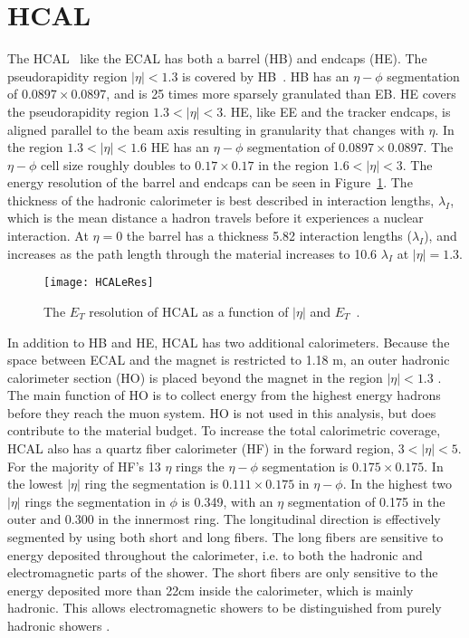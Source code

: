   \section{HCAL}
    The HCAL~\cite{Baiatian:2007xva} like the ECAL has both a barrel (HB) and endcaps (HE).
    The pseudorapidity region $|\eta|<1.3$ is covered by HB~\cite{tCmsE}. 
    HB has an $\eta-\phi$ segmentation of $0.0897\times0.0897$, and is 25 times more
    	sparsely granulated than EB.
    HE covers the pseudorapidity region $1.3<|\eta|<3$.
    HE, like EE and the tracker endcaps, is aligned parallel to the beam axis
    	resulting in granularity that changes with $\eta$.
    In the region $1.3 <|\eta|< 1.6$ HE has an $\eta-\phi$ segmentation of 
    	$0.0897\times0.0897$.
    The $\eta-\phi$ cell size roughly doubles to $0.17\times0.17$ in the region
    	$1.6 <|\eta|< 3$.
    The energy resolution of the barrel and endcaps can be seen in  
    	Figure~\ref{HCALeRes}.
    The thickness of the hadronic calorimeter is best described in interaction
    	lengths, $\lambda_I$, which is the mean distance a hadron travels before 
       it experiences a nuclear interaction.
    At $\eta = 0$ the barrel has a thickness 5.82 interaction lengths 
    	($\lambda_{I}$), and increases as the path length through the material 
    	increases to 10.6 $\lambda_{I}$ at $|\eta| = 1.3$.
    \begin{figure}[h]
      \centering
        \texttt{[image: HCALeRes]}
      \caption{The $E_{T}$ resolution of HCAL as a function of $|\eta|$ and 
        $E_{T}$~\cite{tCmsE}.}
      \label{HCALeRes}
    \end{figure}
    
    In addition to HB and HE, HCAL has two additional calorimeters.
    Because the space between ECAL and the magnet is restricted to 1.18 m, an
    	outer hadronic calorimeter section (HO) is placed beyond the magnet
    	in the region $|\eta|<1.3$ \cite{tCmsE}.
    The main function of HO is to collect energy from the highest energy hadrons
    	before they reach the muon system.
    HO is not used in this analysis, but does contribute to the material budget. 
    To increase the total calorimetric coverage, HCAL also has a quartz fiber 
    	calorimeter (HF) in the forward region, $3 < |\eta| < 5$.
    For the majority of HF's 13 $\eta$ rings the $\eta-\phi$ segmentation is 
    	$0.175\times0.175$.
    In the lowest $|\eta|$ ring the segmentation is $0.111\times0.175$ in 
    	$\eta-\phi$.
    In the highest two $|\eta|$ rings the segmentation in $\phi$ is 0.349, with an
    	$\eta$ segmentation of 0.175 in the outer and 0.300 in the innermost 
    	ring. 
    The longitudinal direction is effectively segmented by using both short and
    	long fibers.
    The long fibers are sensitive to energy deposited throughout the calorimeter, i.e. to both the hadronic and electromagnetic parts of the shower. The short fibers are only sensitive to the energy deposited more than 22cm inside the calorimeter, which is mainly hadronic. 
    This allows electromagnetic showers to be distinguished from purely
      hadronic showers \cite{tCmsE}.

